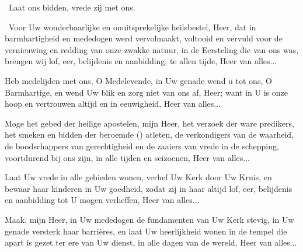 \documentclass[12pt,twoside,a5paper]{article}
\begin{document}


\begin{halfparskip}
  \dd~Laat ons bidden, vrede zij met ons.


  \cc~Voor Uw wonderbaarlijke en onuitsprekelijke heilsbestel, Heer, dat in barmhartigheid en mededogen werd vervolmaakt, voltooid en vervuld voor de vernieuwing en redding van onze zwakke natuur, in de Eersteling die van ons was, brengen wij lof, eer, belijdenis en aanbidding, te allen tijde, Heer van alles...


  Heb medelijden met ons, O Medelevende, in Uw genade wend u tot ons, O Barmhartige, en wend Uw blik en zorg niet van ons af, Heer; want in U is onze hoop en vertrouwen altijd en in eeuwigheid, Heer van alles...


  Moge het gebed der heilige apostelen, mijn Heer, het verzoek der ware predikers, het smeken en bidden der beroemde () atleten, de verkondigers van de waarheid, de boodschappers van gerechtigheid en de zaaiers van vrede in de schepping, voortdurend bij ons zijn, in alle tijden en seizoenen, Heer van alles...


  Laat Uw vrede in alle gebieden wonen, verhef Uw Kerk door Uw Kruis, en bewaar haar kinderen in Uw goedheid, zodat zij in haar altijd lof, eer, belijdenis en aanbidding tot U mogen verheffen, Heer van alles...


  Maak, mijn Heer, in Uw mededogen de fundamenten van Uw Kerk stevig, in Uw genade versterk haar barrières, en laat Uw heerlijkheid wonen in de tempel die apart is gezet ter ere van Uw dienst, in alle dagen van de wereld, Heer van alles...
\end{halfparskip}
\end{document}
